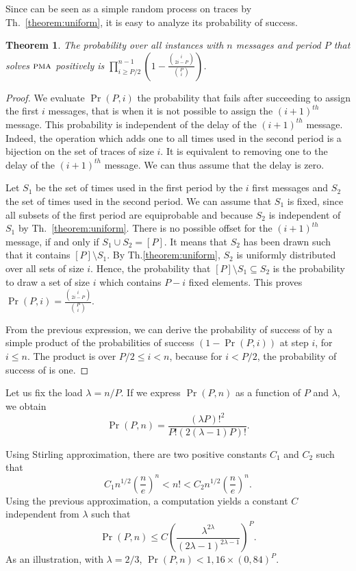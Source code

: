 \documentclass[pdflatex,sn-mathphys,iicol]{sn-jnl}%
\theoremstyle{thmstyleone}%
\newtheorem{theorem}{Theorem}%
\theoremstyle{thmstyletwo}%
\theoremstyle{thmstylethree}%
\begin{document}
Since \greedyuniform can be seen as a simple random process on traces by Th.~\ref{theorem:uniform}, it is easy to analyze its probability of success.

\begin{theorem}
The probability over all instances with $n$ messages and period $P$ that \greedyuniform solves $\textsc{pma}$ positively is $\displaystyle{\prod_{i \geq P/2}^{n-1}\left(1 - \frac{\binom{i}{2i-P}}{\binom{P}{i}}\right)}$.
\end{theorem}
\begin{proof}
We evaluate $\Pr(P,i)$ the probability that \greedyuniform fails after succeeding to assign the first $i$ messages, that is when it is not possible
to assign the $(i+1)^{th}$ message. This probability is independent of the delay of the $(i+1)^{th}$ message. Indeed, the operation which adds one to all times used in the second period is a bijection on the set of traces of size $i$. It is equivalent to removing one to the delay of the $(i+1)^{th}$ message. We can thus assume that the delay is zero.

Let $S_1$ be the set of times used in the first period by the $i$ first messages and $S_2$ the set of times used in the second period. We can assume that $S_1$ is fixed, since all subsets of the first period are equiprobable and because $S_2$ is independent of $S_1$ by Th.~\ref{theorem:uniform}. There is no possible offset for the $(i+1)^{th}$ message, if and only if $S_1 \cup S_2 = [P]$. It means that $S_2$ has been drawn such that it contains $[P] \setminus S_1$. By Th.\ref{theorem:uniform}, $S_2$ is uniformly distributed over all sets of size $i$. Hence, the probability that  $[P]  \setminus S_1 \subseteq S_2$  is the probability to draw a set of size $i$ which contains $P- i$ fixed elements. This proves $\Pr(P,i) = \frac{\binom{i}{2i - P}}{\binom{P}{i}}$.

From the previous expression, we can derive the probability of success of \greedyuniform by a simple product of the probabilities of success $(1 - \Pr(P,i))$ at step $i$, for $i \leq n$. The product is over $ P/2 \leq i < n$, because for $i < P/2$, the probability of success of \greedyuniform is one.  
\end{proof}


Let us fix the load $\lambda = n/P$. 
If we express $\Pr(P,n)$ as a function of $P$ and $\lambda$, we obtain
$$\Pr(P,n) = \frac{(\lambda P)!^2}{P!(2(\lambda -1)P)!}.$$

Using Stirling approximation, there are two positive constants $C_1$ and $C_2$ such that $$C_1 n^{1/2}\left(\frac{n}{e}\right)^n< n! < C_2n^{1/2}\left(\frac{n}{e}\right)^n.$$
Using the previous approximation, a computation yields a constant $C$ independent from $\lambda$ such that $$\Pr(P,n) \leq C \left(\frac{\lambda^{2\lambda}}{(2\lambda -1)^{2\lambda -1}}\right)^P.$$
As an illustration, with $\lambda = 2/3$, $\Pr(P,n) < 1,16 \times (0,84)^P$.
\end{document}
